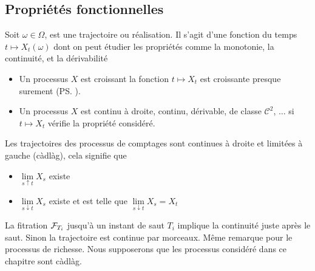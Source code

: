 \subsection{Propriétés fonctionnelles}
Soit $\omega\in\Omega$,  est une trajectoire ou réalisation. Il s'agit d'une fonction du temps $t\mapsto X_t(\omega)$ dont on peut étudier les propriétés comme la monotonie, la continuité, et la dérivabilité 
\begin{itemize}
  \item Un processus $X$ est croissant la fonction $t\mapsto X_t$ est croissante presque surement (\ps).
  \item Un processus $X$ est continu à droite, continu, dérivable, de classe $\mathcal{C}^2$, $\ldots$ si  $t\mapsto X_t$ vérifie la propriété considéré.
\end{itemize}
\begin{ex}
Les trajectoires des processus de comptages sont continues à droite et limitées à gauche (càdlàg), cela signifie que 
\begin{itemize}
    \item $\underset{s\uparrow t}{\lim}X_s$ existe
    \item $\underset{s\downarrow t}{\lim}X_s$ existe et est telle que $\underset{s\downarrow t}{\lim}X_s = X_t$ 
\end{itemize}
La fitration $\mathcal{F}_{T_{i}}$ jusqu'à un instant de saut $T_i$ implique la continuité juste après le saut. Sinon la trajectoire est continue par morceaux. Même remarque pour le processus de richesse. Nous supposerons que les processus considéré dans ce chapitre sont càdlàg.
\end{ex}
